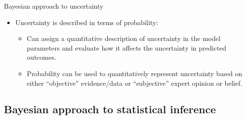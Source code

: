 \documentclass[handout]{beamer}
\begin{document}

\begin{frame}{Bayesian approach to uncertainty}

\begin{itemize}
\item Uncertainty is described in terms of probability:
\begin{itemize}
 \item Can assign a quantitative description of uncertainty in the model parameters and evaluate how it affects the uncertainty in predicted outcomes.
\item Probability can be used to quantitatively represent uncertainty based on either “objective” evidence/data or “subjective” expert opinion or belief.
\end{itemize}
\end{itemize}
\vspace{-0.35in}

\end{frame}

\subsection{Bayesian approach to statistical inference}
\end{document}
